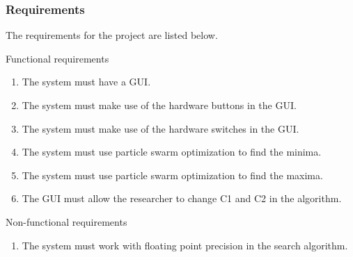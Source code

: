 \subsubsection{Requirements}
The requirements for the project are listed below.

Functional requirements
\begin{enumerate}
	\item The system must have a GUI.
	\item The system must make use of the hardware buttons in the GUI.
	\item The system must make use of the hardware switches in the GUI.
	\item The system must use particle swarm optimization to find the minima.
	\item The system must use particle swarm optimization to find the maxima.
	\item The GUI must allow the researcher to change C1 and C2 in the algorithm.
\end{enumerate}

Non-functional requirements
\begin{enumerate}
	\item The system must work with floating point precision in the search algorithm.
\end{enumerate}
